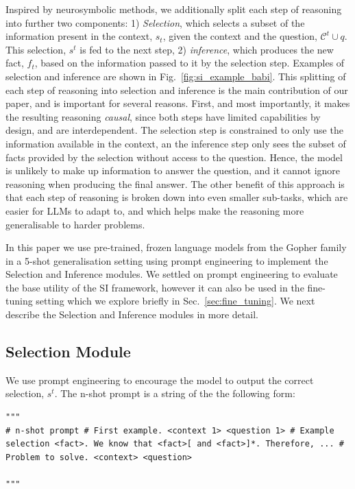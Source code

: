 Inspired by neurosymbolic methods, we additionally split each step of reasoning into further two components: 1) \emph{Selection}, which selects a subset of the information present in the context, $s_t$, given the context and the question, $\mathcal{C}^t \cup q$. This selection, $s^t$ is fed to the next step, 2) \emph{inference}, which produces the new fact, $f_t$, based on the information passed to it by the selection step. Examples of selection and inference are shown in Fig.~\ref{fig:si_example_babi}. This splitting of each step of reasoning into selection and inference is the main contribution of our paper, and is important for several reasons. First, and most importantly, it makes the resulting reasoning \emph{causal}, since both steps have limited capabilities by design, and are interdependent. The selection step is constrained to only use the information available in the context, an the inference step only sees the subset of facts provided by the selection without access to the question. Hence, the model is unlikely to make up information to answer the question, and it cannot ignore reasoning when producing the final answer. The other benefit of this approach is that each step of reasoning is broken down into even smaller sub-tasks, which are easier for LLMs to adapt to, and which helps make the reasoning more generalisable to harder problems. 

In this paper we use pre-trained, frozen language models from the Gopher family \citep{rae2021scaling} in a 5-shot generalisation setting using prompt engineering to implement the Selection and Inference modules. We settled on prompt engineering to evaluate the base utility of the SI framework, however it can also be used in the fine-tuning setting which we explore briefly in Sec.~\ref{sec:fine_tuning}. We next describe the Selection and Inference modules in more detail.

\subsection{Selection Module}\label{sec:selection_module}

We use prompt engineering to encourage the model to output the correct selection, $s^t$. The n-shot prompt is a string of the the following form:

\begin{small}\begin{lstlisting}
"""
# n-shot prompt # First example. <context 1> <question 1> # Example selection <fact>. We know that <fact>[ and <fact>]*. Therefore, ... # Problem to solve. <context> <question>

"""
\end{lstlisting}\end{small}

